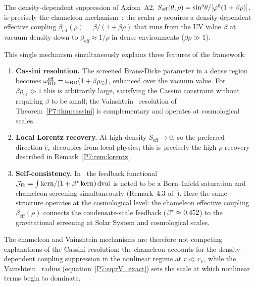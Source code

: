 \begin{remark}
\label{P7:rem:chameleon}
The density-dependent suppression of Axiom~A2,
$S_{\mathrm{eff}}(\theta,\rho) = \sin^4\!\theta/[\varphi^6(1+\beta\rho)]$,
is precisely the chameleon mechanism~\cite{KhouryWeltman2004}: the scalar $\rho$
acquires a density-dependent effective coupling
$\beta_{\mathrm{eff}}(\rho) = \beta/(1+\beta\rho)$
that runs from the UV value $\beta$ at vacuum density down to
$\beta_{\mathrm{eff}}\approx1/\rho$ in dense environments ($\beta\rho\gg1$).

This single mechanism simultaneously explains three features of the framework:
\begin{enumerate}[noitemsep,label=\emph{(\roman*)}]
  \item \textbf{Cassini resolution.}  The screened Brans-Dicke parameter
    in a dense region becomes $\omega_{\mathrm{BD}}^{\mathrm{eff}} = \omega_{\mathrm{BD}}(1+\beta\rho_\odot)$,
    enhanced over the vacuum value.  For $\beta\rho_\odot\gg1$ this is
    arbitrarily large, satisfying the Cassini constraint without requiring
    $\beta$ to be small; the Vainshtein~\cite{Vainshtein1972} resolution of
    Theorem~\ref{P7:thm:cassini} is complementary and operates at
    cosmological scales.
  \item \textbf{Local Lorentz recovery.}  At high density
    $S_{\mathrm{eff}}\to0$, so the preferred direction $\hat{e}_r$
    decouples from local physics; this is precisely the high-$\rho$
    recovery described in Remark~\ref{P7:rem:lorentz}.
  \item \textbf{Self-consistency.}  In~\cite{Paper1} the feedback
    functional $\mathcal{J}_{\mathrm{fb}} = \int\mathrm{kern}/(1+\beta^{*}\,\mathrm{kern})\,\mathrm{dvol}$
    is noted to be a Born--Infeld saturation and chameleon screening
    simultaneously (Remark~4.3 of~\cite{Paper1}).
    Here the same structure operates at the cosmological level:
    the chameleon effective coupling $\beta_{\mathrm{eff}}(\rho)$
    connects the condensate-scale feedback ($\beta^{*}\approx0.452$) to
    the gravitational screening at Solar System and cosmological scales.
\end{enumerate}
The chameleon and Vainshtein mechanisms are therefore not competing
explanations of the Cassini resolution: the chameleon accounts for the
density-dependent coupling suppression in the nonlinear regime at
$r\ll r_V$, while the Vainshtein~\cite{Vainshtein1972} radius
(equation~\eqref{P7:eq:rV_exact}) sets the
scale at which nonlinear terms begin to dominate.
\end{remark}

